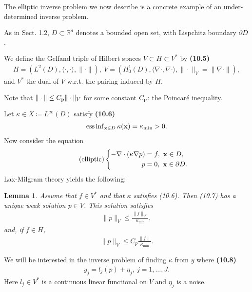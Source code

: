 \documentclass[oneside]{article}
\numberwithin{equation}{section}
\newtheorem{lemma}{Lemma}[section]
\begin{document}
The elliptic inverse problem we now describe is a concrete example of an under-determined inverse problem.

%
As in Sect. 1.2, $D\subset\mathbb{R}^d$ denotes a bounded open set, with Lispchitz boundary $\partial D$.

We define the Gelfand triple of Hilbert spaces $V\subset H\subset V^*$ by \textbf{(10.5)}
\begin{align*}
    H = (L^2(D),\langle\cdot,\cdot\rangle,\|\cdot\|),\ V = (H_0^1(D),\langle\nabla\cdot,\nabla\cdot\rangle,\|\cdot\|_V = \|\nabla\cdot\|),
\end{align*}
and $V^*$ the dual of $V$ w.r.t. the pairing induced by $H$.

Note that $\|\cdot\|\le C_{\rm p}\|\cdot\|_V$ for some constant $C_{\rm p}$: the Poincar\'e inequality.

%
Let $\kappa\in X\coloneqq L^\infty(D)$ satisfy \textbf{(10.6)}
\begin{align*}
    \operatorname{ess\inf}_{{\bf x}\in D} \kappa({\bf x}) = \kappa_{\min} > 0.
\end{align*}
Now consider the equation
\begin{equation*}
    \label{elliptic}
    \tag{elliptic}
    \left\{\begin{split}
        -\nabla\cdot(\kappa\nabla p) &= f,\ {\bf x}\in D,\\
        p &= 0,\ {\bf x}\in\partial D.
    \end{split}\right.    
\end{equation*}
Lax-Milgram theory yields the following:

\begin{lemma}
    Assume that $f\in V^*$ and that $\kappa$ satisfies (10.6). Then (10.7) has a unique weak solution $p\in V$. This solution satisfies
    \begin{align*}
        \|p\|_V\le\frac{\|f\|_{V^*}}{\kappa_{\min}},
    \end{align*}
    and, if $f\in H$,
    \begin{align*}
        \|p\|_V\le C_p\frac{\|f\|}{\kappa_{\min}}.
    \end{align*}
\end{lemma}
We will be interested in the inverse problem of finding $\kappa$ from $y$ where \textbf{(10.8)}
\begin{align*}
    y_j = l_j(p) + \eta_j,\ j = 1,\ldots,J.
\end{align*}
Here $l_j\in V^*$ is a continuous linear functional on $V$ and $\eta_j$ is a noise.
\end{document}

